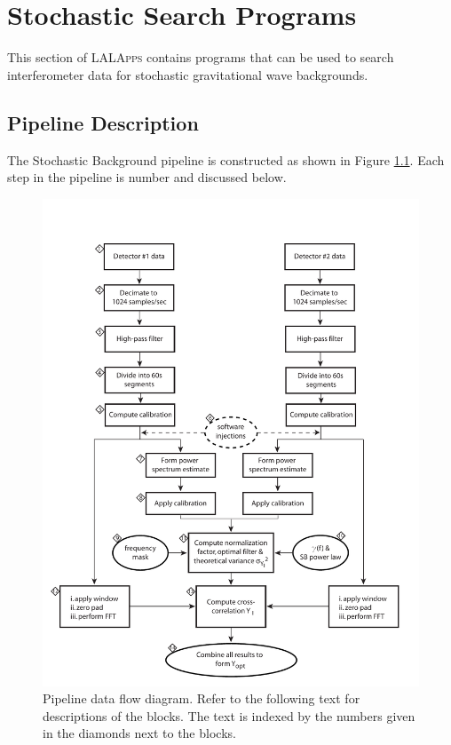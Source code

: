 
\chapter{Stochastic Search Programs}
\label{chapter:stochastic}

This section of \textsc{LALApps} contains programs that can be used to
search interferometer data for stochastic gravitational wave
backgrounds.

\clearpage


\clearpage
\section{Pipeline Description}

The Stochastic Background pipeline is constructed as shown in Figure
\ref{fig:stoch_blockdigram}. Each step in the pipeline is number and
discussed below.

\begin{figure}[htb!]
\begin{center}
\includegraphics[width=5in]{figures/stochastic_flowdiagram}
\caption{Pipeline data flow diagram. Refer to the following text for
descriptions of the blocks. The text is indexed by the numbers given
in the diamonds next to the blocks.}
\label{fig:stoch_blockdigram}
\end{center}
\end{figure}

